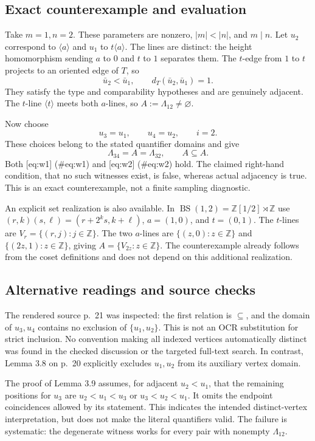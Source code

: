 \documentclass[10pt]{article}
\begin{document}
\subsection*{Exact counterexample and evaluation}
Take \(m=1,n=2\). These parameters are nonzero, \(|m|<|n|\), and \(m\mid n\). Let \(u_2\) correspond to \(\langle a\rangle\) and \(u_1\) to \(t\langle a\rangle\). The lines are distinct: the height homomorphism sending \(a\) to \(0\) and \(t\) to \(1\) separates them. The \(t\)-edge from \(1\) to \(t\) projects to an oriented edge of \(T\), so \[\bar u_2<\bar u_1,\qquad d_T(\bar u_2,\bar u_1)=1.\] They satisfy the type and comparability hypotheses and are genuinely adjacent. The \(t\)-line \(\langle t\rangle\) meets both \(a\)-lines, so \(A:=\Lambda_{12}\ne\varnothing\).\par
Now choose \[u_3=u_1,\qquad u_4=u_2,\qquad i=2.\] These choices belong to the stated quantifier domains and give \[\Lambda_{34}=A=\Lambda_{32},\qquad A\subseteq A.\] Both [eq:w1] (\#eq:w1) and [eq:w2] (\#eq:w2) hold. The claimed right-hand condition, that no such witnesses exist, is false, whereas actual adjacency is true. This is an exact counterexample, not a finite sampling diagnostic.\par
An explicit set realization is also available. In \(\operatorname{BS}(1,2)=\mathbb Z[1/2]\rtimes\mathbb Z\) use \((r,k)(s,\ell)=(r+2^k s,k+\ell)\), \(a=(1,0)\), and \(t=(0,1)\). The \(t\)-lines are \(V_r=\{(r,j):j\in\mathbb Z\}\). The two \(a\)-lines are \(\{(z,0):z\in\mathbb Z\}\) and \(\{(2z,1):z\in\mathbb Z\}\), giving \(A=\{V_{2z}:z\in\mathbb Z\}\). The counterexample already follows from the coset definitions and does not depend on this additional realization.\par
\subsection*{Alternative readings and source checks}
The rendered source p. 21 was inspected: the first relation is \(\subseteq\), and the domain of \(u_3,u_4\) contains no exclusion of \(\{u_1,u_2\}\). This is not an OCR substitution for strict inclusion. No convention making all indexed vertices automatically distinct was found in the checked discussion or the targeted full-text search. In contrast, Lemma 3.8 on p. 20 explicitly excludes \(u_1,u_2\) from its auxiliary vertex domain.\par
The proof of Lemma 3.9 assumes, for adjacent \(u_2<u_1\), that the remaining positions for \(u_3\) are \(u_2<u_1<u_3\) or \(u_3<u_2<u_1\). It omits the endpoint coincidences allowed by its statement. This indicates the intended distinct-vertex interpretation, but does not make the literal quantifiers valid. The failure is systematic: the degenerate witness works for every pair with nonempty \(\Lambda_{12}\).\par
\end{document}
